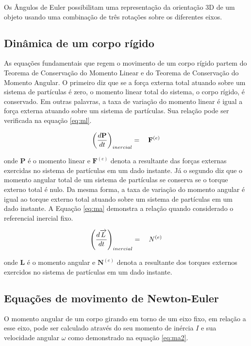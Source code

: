 \documentclass[a4paper, 12pt]{article}
\begin{document}
Os Ângulos de Euler possibilitam uma representação da orientação 3D de um objeto usando uma combinação de três rotações sobre os diferentes eixos. 

\subsection{Dinâmica de um corpo rígido}

As equações fundamentais que regem o movimento de um corpo rígido partem do Teorema de Conservação do Momento Linear e do Teorema de Conservação do Momento Angular. O primeiro diz que se a força externa total atuando sobre um sistema de partículas é zero, o momento linear total do sistema, o corpo rígido, é conservado. Em outras palavras, a taxa de variação do momento linear é igual a força externa atuando sobre um sistema de partículas. Sua relação pode ser verificada na equação \ref{eq:ml}.

\begin{equation}
\centering
{ \left(\frac { d\mathbf{P} }{ dt }\right)}_{inercial} = \quad{ \mathbf{F} }^{ (e) }
\label{eq:ml}
\end{equation}

\noindent onde $\mathbf{P}$ é o momento linear e ${ \mathbf{F} }^{ (e) }$ denota a resultante das forças externas exercidas no sistema de partículas em um dado instante. Já o segundo diz que o momento angular total de um sistema de partículas se conserva se o torque externo total é nulo. Da mesma forma, a taxa de variação do momento angular é igual ao torque externo total atuando sobre um sistema de partículas em um dado instante. A Equação \ref{eq:ma} demonstra a relação quando considerado o referencial inercial fixo.

\begin{equation}
\centering
{ \left( \frac { d\overrightarrow { L } }{ dt }  \right)  }_{ inercial }=\quad { N }^{ (e) }
\label{eq:ma}
\end{equation}

\noindent onde $\mathbf{L}$ é o momento angular e ${ \mathbf{N} }^{ (e) }$ denota a resultante dos torques externos exercidos no sistema de partículas em um dado instante. 

\subsection{Equações de movimento de Newton-Euler}

O momento angular de um corpo girando em torno de um eixo fixo, em relação a esse eixo, pode ser calculado através do seu momento de inércia $I$ e sua velocidade angular $\omega$ como demonstrado na equação \ref{eq:ma2}.
\end{document}
